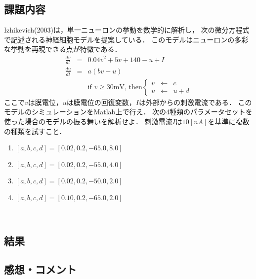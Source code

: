 \documentclass{jarticle}
\begin{document}
\subsection{課題内容}
Izhikevich(2003)は，単一ニューロンの挙動を数学的に解析し，
次の微分方程式で記述される神経細胞モデルを提案している．
このモデルはニューロンの多彩な挙動を再現できる点が特徴である．
%     
\begin{eqnarray}
\frac{dv}{dt} &=& 0.04 v^2 +5v + 140 -u + I \nonumber \\
\frac{du}{dt} &=& a(bv-u) \nonumber \\
&& \mbox{if~} v\geq 30\mbox{mV, then} 
  \left\{ 
	\begin{array}{rcl}
	v & \leftarrow  & c \\
	u & \leftarrow & u+d 
	\end{array}  \nonumber
   \right.
\end{eqnarray}
%
ここで$v$は膜電位，$u$は膜電位の回復変数，$I$は外部からの刺激電流である．
このモデルのシミュレーションをMatlab上で行え．
次の4種類のパラメータセットを使った場合のモデルの振る舞いを解析せよ．
刺激電流$I$は$10[nA]$を基準に複数の種類を試すこと．
\begin{enumerate}
  \item $[a, b, c, d ] = [0.02, 0.2, -65.0, 8.0]$
  \item $[a, b, c, d ] = [0.02, 0.2, -55.0, 4.0]$
  \item $[a, b, c, d ] = [0.02, 0.2, -50.0, 2.0]$
  \item $[a, b, c, d ] = [0.10, 0.2, -65.0, 2.0]$
\end{enumerate}　
%

\subsection{結果}

\subsection{感想・コメント}
\end{document}
